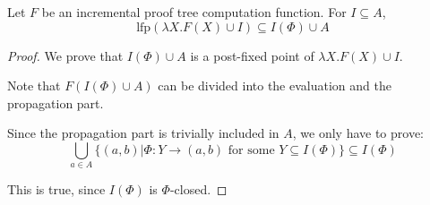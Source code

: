 \documentclass[12pt]{article}
\begin{document}
\begin{theorem}[Completeness]
	Let $F$ be an incremental proof tree computation function.
	For $I\subseteq A$,
	\[\text{lfp}(\lambda X.F(X)\cup I)\subseteq I(\Phi)\cup A\]
\end{theorem}
\begin{proof}
	We prove that $I(\Phi)\cup A$ is a post-fixed point of $\lambda X.F(X)\cup I$.

	Note that $F(I(\Phi)\cup A)$ can be divided into the evaluation and the propagation part.

	Since the propagation part is trivially included in $A$, we only have to prove:
	\[\bigcup_{a\in A}\{(a,b)|\Phi:Y\rightarrow(a,b)\text{ for some }Y\subseteq I(\Phi)\}\subseteq I(\Phi)\]

	This is true, since $I(\Phi)$ is $\Phi$-closed.
\end{proof}
\end{document}
